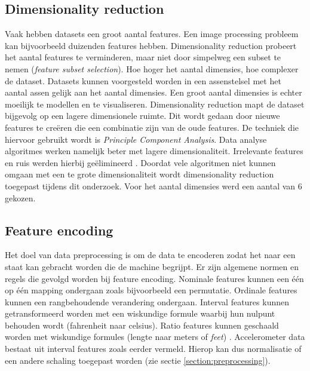 \subsection{Dimensionality reduction}
Vaak hebben datasets een groot aantal features. Een image processing probleem kan bijvoorbeeld duizenden features hebben. Dimensionality reduction probeert het aantal features te verminderen, maar niet door simpelweg een subset te nemen (\textit{feature subset selection}). Hoe hoger het aantal dimensies, hoe complexer de dataset. Datasets kunnen voorgesteld worden in een assenstelsel met het aantal assen gelijk aan het aantal dimensies. Een groot aantal dimensies is echter moeilijk te modellen en te visualiseren. Dimensionality reduction mapt de dataset bijgevolg op een lagere dimensionele ruimte. Dit wordt gedaan door nieuwe features te creëren die een combinatie zijn van de oude features. De techniek die hiervoor gebruikt wordt is \textit{Principle Component Analysis}.
Data analyse algoritmes werken namelijk beter met lagere dimensionaliteit. Irrelevante features en ruis werden hierbij geëlimineerd \cite{ref69}. 
Doordat vele algoritmen niet kunnen omgaan met een te grote dimensionaliteit wordt dimensionality reduction toegepast tijdens dit onderzoek. Voor het aantal dimensies werd een aantal van 6 gekozen.

\subsection{Feature encoding}
Het doel van data preprocessing is om de data te encoderen zodat het naar een staat kan gebracht worden die de machine begrijpt. Er zijn algemene normen en regels die gevolgd worden bij feature encoding. Nominale features kunnen een één op één mapping ondergaan zoals bijvoorbeeld een permutatie. Ordinale features kunnen een rangbehoudende verandering ondergaan. Interval features kunnen getransformeerd worden met een wiskundige formule waarbij hun nulpunt behouden wordt (fahrenheit naar celsius). Ratio features kunnen geschaald worden met wiskundige formules (lengte naar meters of \textit{feet}) \cite{ref69}. Accelerometer data bestaat uit interval features zoals eerder vermeld. Hierop kan dus normalisatie of een andere schaling toegepast worden (zie sectie \ref{section:preprocessing}).

